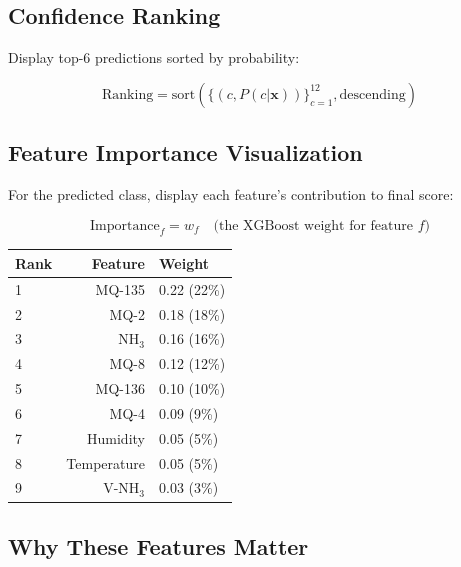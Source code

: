 \documentclass[10pt]{article}
\begin{document}
\subsection{Confidence Ranking}

Display top-6 predictions sorted by probability:

\begin{equation}
\text{Ranking} = \text{sort}(\{(c, P(c|\mathbf{x}))\}_{c=1}^{12}, \text{descending})
\end{equation}

\subsection{Feature Importance Visualization}

For the predicted class, display each feature's contribution to final score:

\begin{equation}
\text{Importance}_f = w_f \quad \text{(the XGBoost weight for feature } f \text{)}
\end{equation}

\begin{table}[ht]
\centering
\begin{tabular}{|l|r|l|}
\hline
\textbf{Rank} & \textbf{Feature} & \textbf{Weight} \\
\hline
1 & MQ-135 & 0.22 (22\%) \\
2 & MQ-2 & 0.18 (18\%) \\
3 & NH$_3$ & 0.16 (16\%) \\
4 & MQ-8 & 0.12 (12\%) \\
5 & MQ-136 & 0.10 (10\%) \\
6 & MQ-4 & 0.09 (9\%) \\
7 & Humidity & 0.05 (5\%) \\
8 & Temperature & 0.05 (5\%) \\
9 & V-NH$_3$ & 0.03 (3\%) \\
\hline
\end{tabular}
\end{table}

\subsection{Why These Features Matter}
\end{document}
